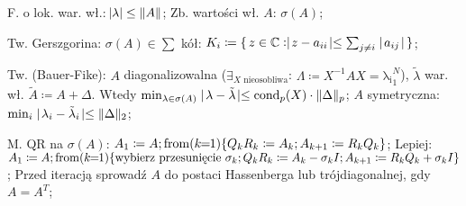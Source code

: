 \entry
F. o lok. war. wł.:
$\abs{\lambda} \leq \norm{A}$;
\entry
Zb. wartości wł. $A$:
$\sigma(A)$;

\entry
Tw. Gerszgorina:
$\sigma(A) \in  \sum$ kół:
$K_i \coloneqq \set{z\in\mathbb{C}: \shortabs{z - a_{ii}} \leq \sum_{j \neq i}\shortabs{a_{ij}}}$;

\entry
Tw. (Bauer-Fike):
$A$ diagonalizowalna
($\exists_{X\text{ nieosobliwa}}$: $\Lambda \coloneqq X^{-1}AX=\mathrm{\lambda_i}_1^N$),
$\tilde{\lambda}$ war. wł. $\tilde{A} \coloneqq A + \Delta$.
Wtedy
$\min_{\lambda \in \sigma(A)} \shortabs{\lambda - \tilde{\lambda}} \leq
\cond[p]{X} \cdot \norm{\Delta}_p$;
\entry
$A$ symetryczna:
$\min_i\shortabs{\lambda_i - \tilde{\lambda}_i} \leq \norm{\Delta}_2$;

\entry
M. QR na $\sigma(A)$:
$ A_1 \coloneqq A;
\fromloop[1]{k}\{
Q_k R_k \coloneqq A_k;
A_{k+1} \coloneqq R_k Q_k
\} $;
\entry
Lepiej:
$ A_1 \coloneqq A;
\fromloop[1]{k}\{
\text{wybierz przesunięcie } \sigma_k;
Q_k R_k \coloneqq A_k - \sigma_kI;
A_{k+1} \coloneqq R_k Q_k + \sigma_kI
\} $;
\entry
Przed iteracją sprowadź $A$ do postaci Hassenberga lub trójdiagonalnej, gdy $A=A^T$;

